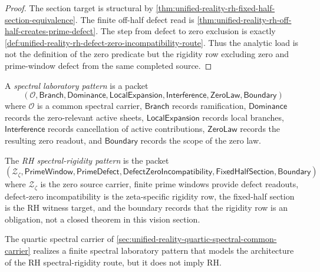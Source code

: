 \begin{proof}
The section target is structural by
\autoref{thm:unified-reality-rh-fixed-half-section-equivalence}. The
finite off-half defect read is
\autoref{thm:unified-reality-rh-off-half-creates-prime-defect}. The
step from defect to zero exclusion is exactly
\autoref{def:unified-reality-rh-defect-zero-incompatibility-route}.
Thus the analytic load is not the definition of the zero predicate but
the rigidity row excluding zero and prime-window defect from the same
completed source.
\end{proof}

\begin{definition}
\label{def:unified-reality-spectral-laboratory-pattern}
A \emph{spectral laboratory pattern} is a packet
$$
(\mathcal O,\mathsf{Branch},\mathsf{Dominance},
\mathsf{LocalExpansion},\mathsf{Interference},
\mathsf{ZeroLaw},\mathsf{Boundary})
$$
where $\mathcal O$ is a common spectral carrier, $\mathsf{Branch}$
records ramification, $\mathsf{Dominance}$ records the zero-relevant
active sheets, $\mathsf{LocalExpansion}$ records local branches,
$\mathsf{Interference}$ records cancellation of active contributions,
$\mathsf{ZeroLaw}$ records the resulting zero readout, and
$\mathsf{Boundary}$ records the scope of the zero law.
\end{definition}

\begin{definition}
\label{def:unified-reality-rh-spectral-rigidity-pattern}
The \emph{RH spectral-rigidity pattern} is the packet
$$
(\mathcal Z_{\zeta},\mathsf{PrimeWindow},\mathsf{PrimeDefect},
\mathsf{DefectZeroIncompatibility},
\mathsf{FixedHalfSection},\mathsf{Boundary})
$$
where $\mathcal Z_{\zeta}$ is the zero source carrier, finite prime
windows provide defect readouts, defect-zero incompatibility is the
zeta-specific rigidity row, the fixed-half section is the RH witness
target, and the boundary records that the rigidity row is an obligation,
not a closed theorem in this vision section.
\end{definition}

\begin{theorem}
\label{thm:unified-reality-quartic-laboratory-not-rh-proof}
The quartic spectral carrier of
\autoref{sec:unified-reality-quartic-spectral-common-carrier} realizes a
finite spectral laboratory pattern that models the architecture of the RH
spectral-rigidity route, but it does not imply RH.
\end{theorem}

